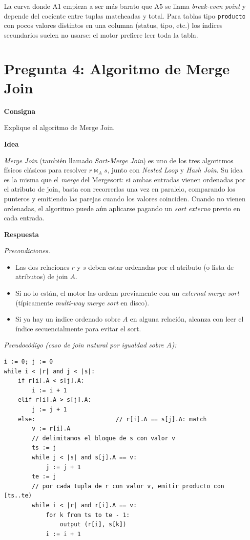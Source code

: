 \documentclass[11pt,a4paper]{article}
\newcommand{\itemcabecera}[1]{\noindent\textbf{#1}\par\medskip}
\newcommand{\bloqueConsigna}{\itemcabecera{Consigna}}
\newcommand{\bloqueIdea}{\itemcabecera{Idea}}
\newcommand{\bloqueRespuesta}{\itemcabecera{Respuesta}}
\begin{document}
\begin{nota}
La curva donde A1 empieza a ser más barato que A5 se llama \emph{break-even point} y depende del cociente entre tuplas matcheadas y total. Para tablas tipo \texttt{producto} con pocos valores distintos en una columna (status, tipo, etc.) los índices secundarios suelen no usarse: el motor prefiere leer toda la tabla.
\end{nota}

\section{Pregunta 4: Algoritmo de Merge Join}

\bloqueConsigna

Explique el algoritmo de Merge Join.

\bloqueIdea

\emph{Merge Join} (también llamado \emph{Sort-Merge Join}) es uno de los tres algoritmos físicos clásicos para resolver $r \bowtie_A s$, junto con \emph{Nested Loop} y \emph{Hash Join}. Su idea es la misma que el \emph{merge} del Mergesort: si ambas entradas vienen ordenadas por el atributo de join, basta con recorrerlas una vez en paralelo, comparando los punteros y emitiendo las parejas cuando los valores coinciden. Cuando no vienen ordenadas, el algoritmo puede aún aplicarse pagando un \emph{sort externo} previo en cada entrada.

\bloqueRespuesta

\textit{Precondiciones.}

\begin{itemize}
    \item Las dos relaciones $r$ y $s$ deben estar ordenadas por el atributo (o lista de atributos) de join $A$.
    \item Si no lo están, el motor las ordena previamente con un \emph{external merge sort} (típicamente \emph{multi-way merge sort} en disco).
    \item Si ya hay un índice ordenado sobre $A$ en alguna relación, alcanza con leer el índice secuencialmente para evitar el sort.
\end{itemize}

\textit{Pseudocódigo (caso de join natural por igualdad sobre $A$):}

\begin{lstlisting}[style=plain]
i := 0; j := 0
while i < |r| and j < |s|:
    if r[i].A < s[j].A:
        i := i + 1
    elif r[i].A > s[j].A:
        j := j + 1
    else:                       // r[i].A == s[j].A: match
        v := r[i].A
        // delimitamos el bloque de s con valor v
        ts := j
        while j < |s| and s[j].A == v:
            j := j + 1
        te := j
        // por cada tupla de r con valor v, emitir producto con [ts..te)
        while i < |r| and r[i].A == v:
            for k from ts to te - 1:
                output (r[i], s[k])
            i := i + 1
\end{lstlisting}
\end{document}
